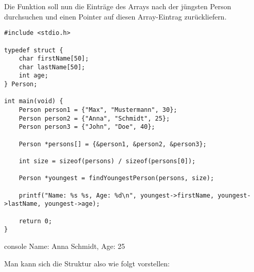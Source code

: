 Die Funktion soll nun die Einträge des Arrays nach der jüngsten Person
durchsuchen und einen Pointer auf diesen Array-Eintrag zurückliefern.

\Vorlage
\begin{verbatim}
#include <stdio.h>

typedef struct {
    char firstName[50];
    char lastName[50];
    int age;
} Person;

int main(void) {
    Person person1 = {"Max", "Mustermann", 30};
    Person person2 = {"Anna", "Schmidt", 25};
    Person person3 = {"John", "Doe", 40};

    Person *persons[] = {&person1, &person2, &person3};

    int size = sizeof(persons) / sizeof(persons[0]);

    Person *youngest = findYoungestPerson(persons, size);

    printf("Name: %s %s, Age: %d\n", youngest->firstName, youngest->lastName, youngest->age);

    return 0;
}
\end{verbatim}

\begin{mybox}[Bildschirmausgabe]{console}
    Name: Anna Schmidt, Age: 25
\end{mybox}


Man kann sich die Struktur also wie folgt vorstellen:

